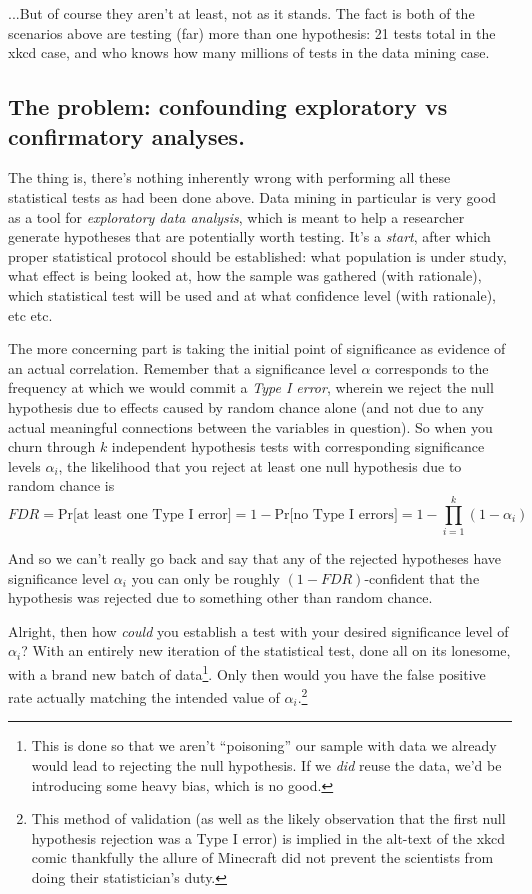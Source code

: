 \documentclass[../main/main.tex]{subfiles}
\begin{document}
...But of course they aren't \textemdash{} at least, not as it stands.
The fact is both of the scenarios above are testing (far) more than
one hypothesis: 21 tests total in the xkcd case, and who knows how many millions
of tests in the data mining case.\par




\subsection{The problem: confounding exploratory vs confirmatory analyses.}

The thing is, there's nothing inherently wrong with performing
all these statistical tests as had been done above.
Data mining in particular is very good as a tool for
\emph{exploratory data analysis}, which is meant to
help a researcher generate hypotheses that are
potentially worth testing. It's a \emph{start}, after which
proper statistical protocol should be established: 
what population is under study, what effect is being looked at,
how the sample was gathered (with rationale),
which statistical test will be used and at what confidence
level (with rationale), etc etc. \par

The more concerning part is taking the initial point of significance
as evidence of an actual correlation.
Remember that a significance level \(\alpha\) corresponds to the
frequency at which we would commit a 
\emph{Type I error}, 
wherein we reject the null hypothesis due to effects caused by random chance alone
(and not due to any actual meaningful connections between
the variables in question).
So when you churn through \(k\) independent
hypothesis tests with corresponding significance levels 
\(\alpha_i\), the likelihood that you reject at least
one null hypothesis due to random chance is
\[FDR = \text{Pr[at least one Type I error]} = 
  1 - \text{Pr[no Type I errors]} = 1 - \prod_{i=1}^{k} (1 - \alpha_i) \]

And so we can't really go back and say that any of the
rejected hypotheses have significance level \(\alpha_i\)
\textemdash{} you can only be roughly \((1 - FDR)\)-confident
that the hypothesis was rejected due to something other
than random chance. \par

Alright, then how \emph{could} you establish a test with
your desired significance level of \(\alpha_i\)?
With an entirely new iteration of the statistical test, 
done all on its lonesome, 
with a brand new batch of data\footnote{
  This is done so that we aren't
  ``poisoning'' our sample with data we already would
  lead to rejecting the null hypothesis. If we \emph{did} 
  reuse the data,
  we'd be introducing some heavy bias, which is no good.
}. Only then would you have the false positive rate actually 
matching the intended value of \(\alpha_i\).\footnote
{
  This method of validation 
  (as well as the likely observation that the first
  null hypothesis rejection was a Type I error) 
  is implied in the alt-text of the xkcd comic 
  \textemdash{}
  thankfully the allure of Minecraft did not prevent
  the scientists from doing their statistician's duty.
}
\end{document}
